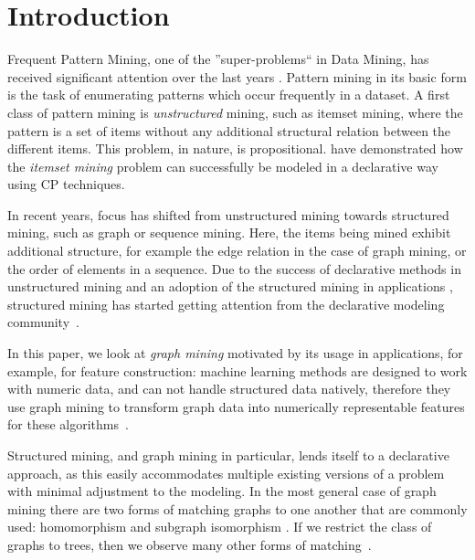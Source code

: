 \section{Introduction}
Frequent Pattern Mining, one of the ''super-problems`` in Data Mining, has received significant attention over the last years \citep{pattern_mining_book}. Pattern mining in its basic form is the task of enumerating patterns which occur frequently in a dataset.
A first class of pattern mining is \emph{unstructured} mining, such as itemset mining, where the pattern is a set of items without any additional structural relation between the different items.
This problem, in nature, is propositional.
\citet{tias_original} have demonstrated how the \emph{itemset mining} problem can successfully be modeled in a declarative way using CP techniques.

In recent years, focus has shifted from unstructured mining towards structured mining, such as graph or sequence mining.
Here, the items being mined exhibit additional structure, for example the edge relation in the case of graph mining, or the order of elements in a sequence.
Due to the success of declarative methods in unstructured mining \citep{tias_original,mining_cp_extra,tias_declarative_pattern_mining} and an adoption of the structured mining in applications \citep{pattern_mining_classification}, 
structured mining has started getting attention from the declarative modeling community~\citep{cp_sequence_mining,ilp_graph_mining}.

In this paper, we look at \emph{graph mining} motivated by its usage in applications, for example, for feature construction:
machine learning methods are designed to work with numeric data, and can not handle structured data natively, therefore they use graph mining to transform graph data into numerically representable features for these algorithms~\citep{pattern_mining_classification}.

Structured mining, and graph mining in particular, lends itself to a declarative approach, as this easily accommodates multiple existing versions of a problem with minimal adjustment to the modeling.
In the most general case of graph mining there are two forms of matching graphs to one another that are commonly used: homomorphism \citep{theta_subsumption} and subgraph isomorphism \citep{gspan}.
If we restrict the class of graphs to trees, then we observe many other forms of matching~\citep{subtree_overview}.

